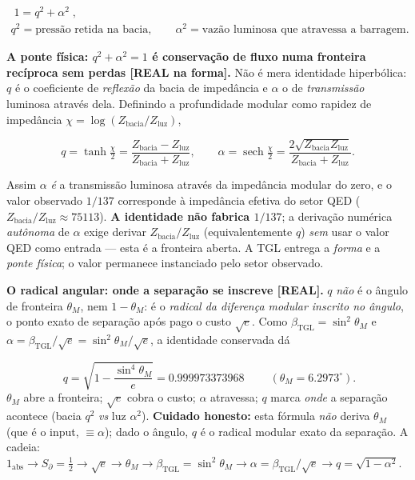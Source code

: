 \documentclass[11pt]{article}
\newcommand{\bTGL}{\beta_{\mathrm{TGL}}}\newcommand{\Msun}{M_{\odot}}\newcommand{\TGL}{\mathrm{TGL}}
\theoremstyle{definition}\newtheorem{deriv}{Derivação}
\begin{document}
\begin{equation}\begin{gathered}\boxed{\;1=q^2+\alpha^2\;},\\ q^2=\text{pressão retida na bacia},\qquad \alpha^2=\text{vazão luminosa que atravessa a barragem}.\end{gathered}\end{equation}

\textbf{A ponte física: $q^2+\alpha^2=1$ é conservação de fluxo numa fronteira recíproca sem perdas \textsf{[REAL na forma]}.} Não é mera identidade hiperbólica: $q$ é o coeficiente de \emph{reflexão} da bacia de impedância e $\alpha$ o de \emph{transmissão} luminosa através dela. Definindo a profundidade modular como rapidez de impedância $\chi=\log(Z_{\mathrm{bacia}}/Z_{\mathrm{luz}})$,

\begin{equation}q=\tanh\tfrac\chi2=\frac{Z_{\mathrm{bacia}}-Z_{\mathrm{luz}}}{Z_{\mathrm{bacia}}+Z_{\mathrm{luz}}},\qquad \alpha=\operatorname{sech}\tfrac\chi2=\frac{2\sqrt{Z_{\mathrm{bacia}}Z_{\mathrm{luz}}}}{Z_{\mathrm{bacia}}+Z_{\mathrm{luz}}}.\end{equation}

Assim $\alpha$ \emph{é} a transmissão luminosa através da impedância modular do zero, e o valor observado $1/137$ corresponde à impedância efetiva do setor QED ($Z_{\mathrm{bacia}}/Z_{\mathrm{luz}}\approx75113$). \textbf{A identidade não fabrica $1/137$}; a derivação numérica \emph{autônoma} de $\alpha$ exige derivar $Z_{\mathrm{bacia}}/Z_{\mathrm{luz}}$ (equivalentemente $q$) \emph{sem} usar o valor QED como entrada --- esta é a fronteira aberta. A TGL entrega a \emph{forma} e a \emph{ponte física}; o valor permanece instanciado pelo setor observado.

\textbf{O radical angular: onde a separação se inscreve \textsf{[REAL]}.} $q$ \emph{não} é o ângulo de fronteira $\theta_M$, nem $1-\theta_M$: é o \emph{radical da diferença modular inscrito no ângulo}, o ponto exato de separação após pago o custo $\sqrt e$. Como $\bTGL=\sin^2\theta_M$ e $\alpha=\bTGL/\sqrt e=\sin^2\theta_M/\sqrt e$, a identidade conservada dá

\begin{equation}\boxed{\;q=\sqrt{1-\frac{\sin^4\theta_M}{e}}=0.999973373968\;}\qquad(\theta_M=6.2973^\circ).\end{equation}\noindent $\theta_M$ abre a fronteira; $\sqrt e$ cobra o custo; $\alpha$ atravessa; $q$ marca \emph{onde} a separação acontece (bacia $q^2$ \emph{vs} luz $\alpha^2$). \textbf{Cuidado honesto:} esta fórmula \emph{não} deriva $\theta_M$ (que é o input, $\equiv\alpha$); dado o ângulo, $q$ é o radical modular exato da separação. A cadeia: $1_{\mathrm{abs}}\to S_\partial=\tfrac12\to\sqrt e\to\theta_M\to\bTGL=\sin^2\theta_M\to\alpha=\bTGL/\sqrt e\to q=\sqrt{1-\alpha^2}$.
\end{document}
